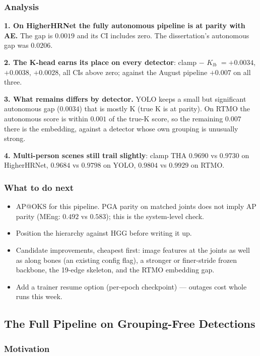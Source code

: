 \subsubsection{Analysis}

\textbf{1. On HigherHRNet the fully autonomous pipeline is at parity with AE.} The gap is $0.0019$ and its CI includes zero. The dissertation's autonomous gap was $0.0206$.

\textbf{2. The K-head earns its place on every detector}: clamp $-$ $K_{lb}$ $= +0.0034$, $+0.0038$, $+0.0028$, all CIs above zero; against the August pipeline $+0.007$ on all three.

\textbf{3. What remains differs by detector.} YOLO keeps a small but significant autonomous gap ($0.0034$) that is mostly K (true K is at parity). On RTMO the autonomous score is within $0.001$ of the true-K score, so the remaining $0.007$ there is the embedding, against a detector whose own grouping is unusually strong.

\textbf{4. Multi-person scenes still trail slightly}: clamp THA $0.9690$ vs $0.9730$ on HigherHRNet, $0.9684$ vs $0.9798$ on YOLO, $0.9804$ vs $0.9929$ on RTMO.

\subsubsection{What to do next}

\begin{itemize}
    \item AP@OKS for this pipeline. PGA parity on matched joints does not imply AP parity (MEng: $0.492$ vs $0.583$); this is the system-level check.
    \item Position the hierarchy against HGG \cite{jin2020hgg} before writing it up.
    \item Candidate improvements, cheapest first: image features at the joints as well as along bones (an existing config flag), a stronger or finer-stride frozen backbone, the 19-edge skeleton, and the RTMO embedding gap.
    \item Add a trainer resume option (per-epoch checkpoint) --- outages cost whole runs this week.
\end{itemize}

\subsection{The Full Pipeline on Grouping-Free Detections}

\subsubsection{Motivation}

